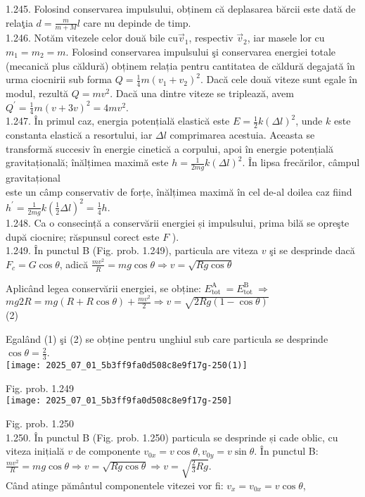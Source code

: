 1.245. Folosind conservarea impulsului, obținem că deplasarea bărcii este dată de relaţia $d=\frac{m}{m+M} l$ care nu depinde de timp.\\
1.246. Notăm vitezele celor două bile $\mathrm{cu} \vec{v}_{1}$, respectiv $\vec{v}_{2}$, iar masele lor cu $m_{1}=m_{2}=m$. Folosind conservarea impulsului şi conservarea energiei totale (mecanică plus căldură) obținem relația pentru cantitatea de căldură degajată în urma ciocnirii sub forma $Q=\frac{1}{4} m\left(v_{1}+v_{2}\right)^{2}$. Dacă cele două viteze sunt egale în modul, rezultă $Q=m v^{2}$. Dacă una dintre viteze se triplează, avem $Q^{\prime}=\frac{1}{4} m(v+3 v)^{2}=4 m v^{2}$.\\
1.247. În primul caz, energia potențială elastică este $E=\frac{1}{2} k(\Delta l)^{2}$, unde $k$ este constanta elastică a resortului, iar $\Delta l$ comprimarea acestuia. Aceasta se transformă succesiv în energie cinetică a corpului, apoi în energie potențială gravitațională; înălțimea maximă este $h=\frac{1}{2 m g} k(\Delta l)^{2}$. În lipsa frecărilor, câmpul gravitațional\\
este un câmp conservativ de forțe, înălțimea maximă în cel de-al doilea caz fiind $h^{\prime}=\frac{1}{2 m g} k\left(\frac{1}{2} \Delta l\right)^{2}=\frac{1}{4} h$.\\
1.248. Ca o consecință a conservării energiei și impulsului, prima bilă se opreşte după ciocnire; răspunsul corect este $F$ ).\\
1.249. În punctul B (Fig. prob. 1.249), particula are viteza $v$ şi se desprinde dacă $F_{c}=G \cos \theta$, adică $\frac{m v^{2}}{R}=m g \cos \theta \Rightarrow v=\sqrt{R g \cos \theta}$

Aplicând legea conservării energiei, se obține: $E_{\text {tot }}^{\mathrm{A}}=E_{\text {tot }}^{\mathrm{B}} \Rightarrow$\\
$m g 2 R=m g(R+R \cos \theta)+\frac{m v^{2}}{2} \Rightarrow v=\sqrt{2 R g(1-\cos \theta)}$\\
(2)

Egalând (1) şi (2) se obține pentru unghiul sub care particula se desprinde $\cos \theta=\frac{2}{3}$.\\
\texttt{[image: 2025\_07\_01\_5b3ff9fa0d508c8e9f17g-250(1)]}

Fig. prob. 1.249\\
\texttt{[image: 2025\_07\_01\_5b3ff9fa0d508c8e9f17g-250]}

Fig. prob. 1.250\\
1.250. În punctul B (Fig. prob. 1.250) particula se desprinde și cade oblic, cu viteza inițială $v$ de componente $v_{0 x}=v \cos \theta, v_{0 y}=v \sin \theta$. În punctul B: $\frac{m v^{2}}{R}=m g \cos \theta \Rightarrow v=\sqrt{R g \cos \theta} \Rightarrow v=\sqrt{\frac{2}{3} R g}$.\\
Când atinge pământul componentele vitezei vor fi: $v_{x}=v_{0 x}=v \cos \theta$,


